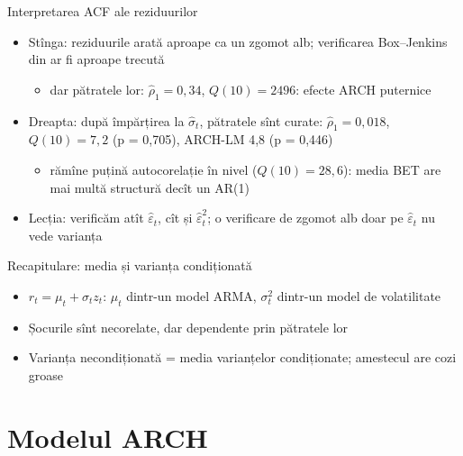 \begin{frame}{Interpretarea ACF ale reziduurilor}
\itemsize{\small}
\begin{itemize}
    \item Stînga: reziduurile arată aproape ca un zgomot alb; verificarea Box--Jenkins din  ar fi aproape trecută
    \begin{itemize}
        \item dar pătratele lor: $\hat\rho_1 = 0{,}34$, $Q(10) = 2496$: efecte ARCH puternice
    \end{itemize}
    \item Dreapta: după împărțirea la $\hat\sigma_t$, pătratele sînt curate: $\hat\rho_1 = 0{,}018$, $Q(10) = 7{,}2$ (p = 0{,}705), ARCH-LM 4{,}8 (p = 0{,}446)
    \begin{itemize}
        \item rămîne puțină autocorelație în nivel ($Q(10) = 28{,}6$): media BET are mai multă structură decît un AR(1)
    \end{itemize}
    \item Lecția: verificăm atît $\hat\varepsilon_t$, cît și $\hat\varepsilon_t^2$; o verificare de zgomot alb doar pe $\hat\varepsilon_t$ nu vede varianța
\end{itemize}
\end{frame}

\begin{frame}{Recapitulare: media și varianța condiționată}
\itemsize{\small}
\begin{itemize}
    \item $r_t = \mu_t + \sigma_t z_t$: $\mu_t$ dintr-un model ARMA, $\sigma_t^2$ dintr-un model de volatilitate
    \item Șocurile sînt necorelate, dar dependente prin pătratele lor
    \item Varianța necondiționată = media varianțelor condiționate; amestecul are cozi groase
\end{itemize}
\end{frame}


\section{Modelul ARCH}

